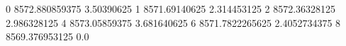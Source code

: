 0 8572.880859375 3.50390625
1 8571.69140625 2.314453125
2 8572.36328125 2.986328125
4 8573.05859375 3.681640625
6 8571.7822265625 2.4052734375
8 8569.376953125 0.0
